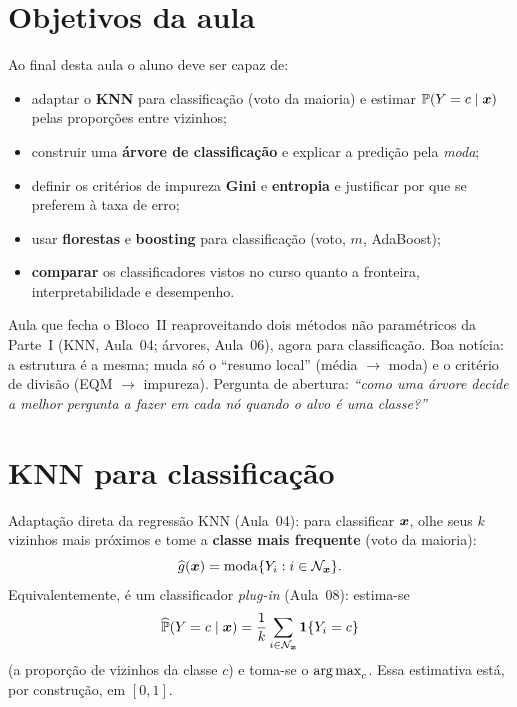 \documentclass[11pt,a4paper]{article}
\begin{document}

\section*{Objetivos da aula}
Ao final desta aula o aluno deve ser capaz de:
\begin{itemize}[leftmargin=1.4cm]
  \item adaptar o \textbf{KNN} para classificação (voto da maioria) e estimar
        $\mathbb{P}(Y=c\mid\bm{x})$ pelas proporções entre vizinhos;
  \item construir uma \textbf{árvore de classificação} e explicar a predição pela
        \emph{moda};
  \item definir os critérios de impureza \textbf{Gini} e \textbf{entropia} e
        justificar por que se preferem à taxa de erro;
  \item usar \textbf{florestas} e \textbf{boosting} para classificação (voto, $m$,
        AdaBoost);
  \item \textbf{comparar} os classificadores vistos no curso quanto a fronteira,
        interpretabilidade e desempenho.
\end{itemize}

\begin{emsala}
Aula que fecha o Bloco~II reaproveitando dois métodos não paramétricos da Parte~I
(KNN, Aula~04; árvores, Aula~06), agora para classificação. Boa notícia: a estrutura
é a mesma; muda só o ``resumo local'' (média $\to$ moda) e o critério de divisão
(EQM $\to$ impureza). Pergunta de abertura: \emph{``como uma árvore decide a melhor
pergunta a fazer em cada nó quando o alvo é uma classe?''}
\end{emsala}

\section{KNN para classificação}
Adaptação direta da regressão KNN (Aula~04): para classificar $\bm{x}$, olhe seus $k$
vizinhos mais próximos e tome a \textbf{classe mais frequente} (voto da maioria):
\begin{equation}\label{eq:knncls}
  \widehat{g}(\bm{x}) = \operatorname{moda}\{Y_i : i\in\mathcal{N}_{\bm{x}}\}.
\end{equation}
Equivalentemente, é um classificador \emph{plug-in} (Aula~08): estima-se
\[
  \widehat{\mathbb{P}}(Y=c\mid\bm{x}) = \frac{1}{k}\sum_{i\in\mathcal{N}_{\bm{x}}}\mathbf{1}\!\left\{Y_i=c\right\}
\]
(a proporção de vizinhos da classe $c$) e toma-se o $\argmax_c$. Essa estimativa
está, por construção, em $[0,1]$.
\end{document}
